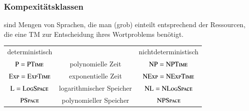 \documentclass[aspectratio=1610,onlymath]{beamer}
\begin{document}
\maketitle


\begin{frame}\frametitle{Kompexitätsklassen}

 sind Mengen von Sprachen, die man (grob) einteilt entsprechend der Ressourcen,
die eine TM zur Entscheidung ihres Wortproblems benötigt.\bigskip

\begin{tabular}{ccc}
\alert{deterministisch} & & \alert{nichtdeterministisch} \\[1ex]
${\textsc{P}}={\textsc{PTime}}$ & \alert{polynomielle Zeit} & ${\textsc{NP}}={\textsc{NPTime}}$\\
${\textsc{Exp}}={\textsc{ExpTime}}$ & \alert{exponentielle Zeit} & ${\textsc{NExp}}={\textsc{NExpTime}}$\\[1ex]
${\textsc{L}}={\textsc{LogSpace}}$ & \alert{logarithmischer Speicher} & ${\textsc{NL}}={\textsc{NLogSpace}}$\\
${\textsc{PSpace}}$ & \alert{polynomieller Speicher} & ${\textsc{NPSpace}}$\\
\end{tabular}

\end{frame}
\end{document}
